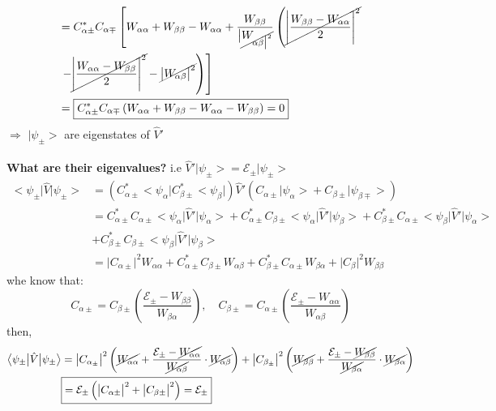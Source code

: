 \documentclass[12pt,fancychapters]{report}
\numberwithin{equation}{section}
\begin{document}
\begin{align*}
  &= C_{\alpha\pm}^*C_{\alpha\mp}\left[W_{\alpha\alpha}+W_{\beta\beta}-W_{\alpha\alpha} + 
    \frac{W_{\beta\beta}}{\big|\cancel{W_{\alpha\beta\big|^2}}}\left(\cancel{\Bigg|\frac{W_{\beta\beta}-
  W_{\alpha\alpha}}{2}\Bigg|^2}\right. \right.\\
  &\left. \left. -\cancel{\Bigg|\frac{W_{\alpha\alpha}-
W_{\beta\beta}}{2}\Bigg|^2}-\cancel{\big|W_{\alpha\beta}\big|^2} \right)\right]\\
  &= \boxed{C_{\alpha\pm}^* C_{\alpha\mp}\left(W_{\alpha\alpha}+W_{\beta\beta}-W_{\alpha\alpha}-
  W_{\beta\beta}\right) = 0}
 \end{align*}
 $\Rightarrow$ $\big|\psi_\pm\big>$ are eigenstates of $\hat{V}'$\\
 \\
 \textbf{What are their eigenvalues?} i.e $\hat{V}'\big|\psi_\pm\big> = \mathcal{E}_\pm \big|
 \psi_\pm\big>$
 \begin{align*}
 \big<\psi_\pm\big|\hat{V}\big|\psi_\pm\big>&= \left(C_{\alpha\pm}^*\big<\psi_\alpha\big|
  C_{\beta\pm}^*\big<\psi_\beta\big|\right)\hat{V}'\left(C_{\alpha\pm}\big|\psi_\alpha\big>
  + C_{\beta\pm}\big|\psi_{\beta\mp}\big>\right)\\
    &= C_{\alpha\pm}^*C_{\alpha\pm}\big<\psi_\alpha\big|\hat{V}'\big|\psi_{\alpha}\big> + 
  C_{\alpha\pm}^*C_{\beta\pm}\big<\psi_\alpha\big|\hat{V}'\big|\psi_{\beta}\big>+C_{\beta\pm}^*
  C_{\alpha\pm}\big<\psi_\beta\big|\hat{V}'\big|\psi_{\alpha}\big>\\
    &+C_{\beta\pm}^*C_{\beta\pm}\big<\psi_\beta\big|\hat{V}'\big|\psi_{\beta}\big>\\
    &= \big|C_{\alpha\pm}\big|^2W_{\alpha\alpha}+C_{\alpha\pm}^*C_{\beta\pm}W_{\alpha\beta}+
    C_{\beta\pm}^*C_{\alpha\pm}W_{\beta\alpha}+\big|C_{\beta}\big|^2W_{\beta\beta}
\end{align*}
whe know that:
\[
  C_{\alpha\pm} = C_{\beta\pm}\left(\frac{\mathcal{E}_\pm - W_{\beta\beta}}{W_{\beta\alpha}}
    \right), \quad C_{\beta\pm} = C_{\alpha\pm}\left(\frac{\mathcal{E}_\pm - W_{\alpha\alpha}}{
        W_{\alpha\beta}
    }\right)
\]
then, 
\begin{align*}
  \big<\psi_\pm\big|\hat{V}\big|\psi_\pm\big>&=
  \big|C_{\alpha_\pm}\big|^2\left(\cancel{W_{\alpha\alpha}}+\frac{\mathcal{E}_\pm -
  \cancel{W_{\alpha\alpha}}}{\cancel{W_{\alpha\beta}}}\cdot \cancel{W_{\alpha\beta}}\right)
  +\big|C_{\beta_\pm}\big|^2\left(\cancel{W_{\beta\beta}}+\frac{\mathcal{E}_\pm -
  \cancel{W_{\beta\beta}}}{\cancel{W_{\beta\alpha}}}\cdot \cancel{W_{\beta\alpha}}\right)\\
  &\boxed{= \mathcal{E}_\pm \left(\big|C_{\alpha\pm}\big|^2+\big|C_{\beta\pm} \big|^2\right)
  = \mathcal{E}_\pm}
\end{align*}
\end{document}
